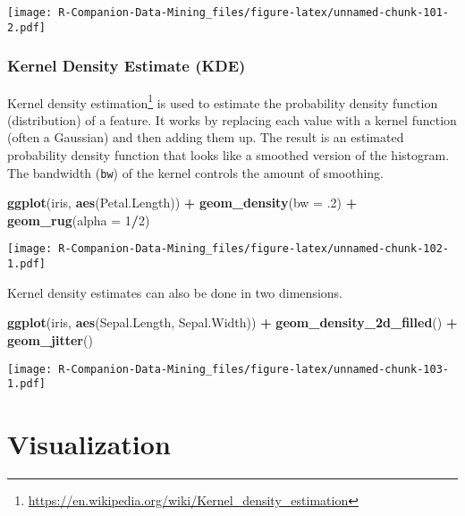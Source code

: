 \documentclass[
  notitlepage]{book}
\newenvironment{Shaded}{\begin{snugshade}}{\end{snugshade}}
\newcommand{\DataTypeTok}[1]{\textcolor[rgb]{0.13,0.29,0.53}{#1}}
\newcommand{\DecValTok}[1]{\textcolor[rgb]{0.00,0.00,0.81}{#1}}
\newcommand{\FloatTok}[1]{\textcolor[rgb]{0.00,0.00,0.81}{#1}}
\newcommand{\KeywordTok}[1]{\textcolor[rgb]{0.13,0.29,0.53}{\textbf{#1}}}
\newcommand{\NormalTok}[1]{#1}
\newcommand{\OperatorTok}[1]{\textcolor[rgb]{0.81,0.36,0.00}{\textbf{#1}}}
\newcommand{\StringTok}[1]{\textcolor[rgb]{0.31,0.60,0.02}{#1}}
\DeclareRobustCommand{\href}[2]{#2\footnote{\url{#1}}}
\begin{document}
\texttt{[image: R-Companion-Data-Mining\_files/figure-latex/unnamed-chunk-101-2.pdf]}

\hypertarget{kernel-density-estimate-kde}{%
\subsubsection{Kernel Density Estimate (KDE)}\label{kernel-density-estimate-kde}}

\href{https://en.wikipedia.org/wiki/Kernel_density_estimation}{Kernel density
estimation} is
used to estimate the probability density function (distribution) of a
feature. It works by replacing each value with a kernel function (often
a Gaussian) and then adding them up. The result is an estimated
probability density function that looks like a smoothed version of the
histogram. The bandwidth (\texttt{bw}) of the kernel controls the amount of
smoothing.

\begin{Shaded}
\begin{Highlighting}[]
\KeywordTok{ggplot}\NormalTok{(iris, }\KeywordTok{aes}\NormalTok{(Petal.Length)) }\OperatorTok{+}
\StringTok{  }\KeywordTok{geom\_density}\NormalTok{(}\DataTypeTok{bw =} \FloatTok{.2}\NormalTok{) }\OperatorTok{+}
\StringTok{  }\KeywordTok{geom\_rug}\NormalTok{(}\DataTypeTok{alpha =} \DecValTok{1}\OperatorTok{/}\DecValTok{2}\NormalTok{)}
\end{Highlighting}
\end{Shaded}

\texttt{[image: R-Companion-Data-Mining\_files/figure-latex/unnamed-chunk-102-1.pdf]}

Kernel density estimates can also be done in two dimensions.

\begin{Shaded}
\begin{Highlighting}[]
\KeywordTok{ggplot}\NormalTok{(iris, }\KeywordTok{aes}\NormalTok{(Sepal.Length, Sepal.Width)) }\OperatorTok{+}
\StringTok{  }\KeywordTok{geom\_density\_2d\_filled}\NormalTok{() }\OperatorTok{+}
\StringTok{  }\KeywordTok{geom\_jitter}\NormalTok{()}
\end{Highlighting}
\end{Shaded}

\texttt{[image: R-Companion-Data-Mining\_files/figure-latex/unnamed-chunk-103-1.pdf]}

\hypertarget{visualization}{%
\section{Visualization}\label{visualization}}
\end{document}
